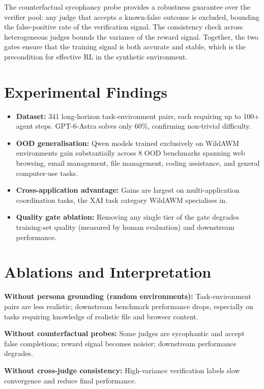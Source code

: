 \documentclass[10pt,twocolumn]{article}
\begin{document}
The counterfactual sycophancy probe provides a robustness guarantee over
the verifier pool: any judge that accepts a known-false outcome is excluded,
bounding the false-positive rate of the verification signal. The consistency
check across heterogeneous judges bounds the variance of the reward signal.
Together, the two gates ensure that the training signal is both accurate and
stable, which is the precondition for effective RL in the synthetic environment.

\section{Experimental Findings}

\begin{itemize}[itemsep=2pt,parsep=0pt]
  \item \textbf{Dataset:} 341 long-horizon task-environment pairs, each
    requiring up to 100+ agent steps. GPT-6-Astra solves only 60\%,
    confirming non-trivial difficulty.
  \item \textbf{OOD generalisation:} Qwen models trained exclusively on
    WildAWM environments gain substantially across 8 OOD benchmarks
    spanning web browsing, email management, file management, coding
    assistance, and general computer-use tasks.
  \item \textbf{Cross-application advantage:} Gains are largest on
    multi-application coordination tasks, the XAI task category WildAWM
    specialises in.
  \item \textbf{Quality gate ablation:} Removing any single tier of the
    gate degrades training-set quality (measured by human evaluation) and
    downstream performance.
\end{itemize}

\section{Ablations and Interpretation}

\textbf{Without persona grounding (random environments):} Task-environment
pairs are less realistic; downstream benchmark performance drops, especially
on tasks requiring knowledge of realistic file and browser content.

\textbf{Without counterfactual probes:} Some judges are sycophantic and
accept false completions; reward signal becomes noisier; downstream
performance degrades.

\textbf{Without cross-judge consistency:} High-variance verification
labels slow convergence and reduce final performance.
\end{document}
